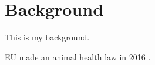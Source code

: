 \chapter{Background}
\label{chap:background}

This is my background.

EU made an animal health law in 2016 \autocite{EU2016}.


